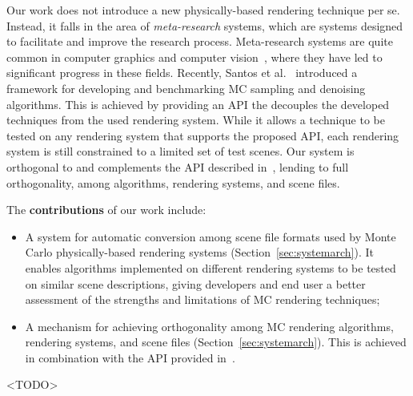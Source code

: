Our work does not introduce a new physically-based rendering technique per se. 
Instead, it falls in the area of {\it meta-research} systems, which are systems 
designed to facilitate and improve the research process. Meta-research systems 
are quite common in computer graphics and computer vision~\cite{MiddleburyStereo, 
MiddleburyFlow, AlphaMatting, VideoMatting}, where they have led to significant 
progress in these fields. 
Recently, Santos et al.~\cite{Santos:2018:FBKSD} introduced a framework for 
developing and benchmarking MC sampling and denoising algorithms. This is 
achieved by providing an API the decouples the developed techniques from the 
used rendering system. While it allows a technique to be tested on any rendering 
system that supports the proposed API, each rendering system is still 
constrained to a limited set of test scenes. Our system is orthogonal to and 
complements the API described in~\cite{Santos:2018:FBKSD}, lending to full 
orthogonality, among algorithms, rendering systems, and scene files.

The {\bf contributions} of our work include:
\begin{itemize}
	\item A system for automatic conversion among scene file formats used by 
Monte Carlo physically-based rendering systems (Section~\ref{sec:systemarch}).
	It enables algorithms implemented on different rendering systems to be 
tested on similar scene descriptions, giving developers and end user a better 
assessment of the strengths and limitations of MC rendering techniques;
	\item A mechanism for achieving  orthogonality among MC rendering 
algorithms, rendering systems, and scene files (Section~\ref{sec:systemarch}). 
This is achieved in combination with the API provided 
in~\cite{Santos:2018:FBKSD}. 
\end{itemize}


<TODO>
